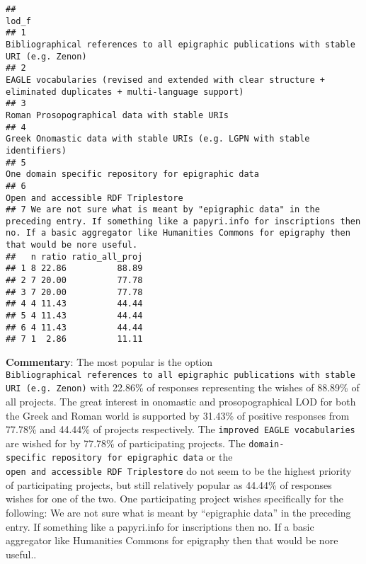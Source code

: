 \documentclass[
]{article}
\begin{document}
\begin{verbatim}
##                                                                                                                                                                                                                              lod_f
## 1                                                                                                                                           Bibliographical references to all epigraphic publications with stable URI (e.g. Zenon)
## 2                                                                                                                  EAGLE vocabularies (revised and extended with clear structure + eliminated duplicates + multi-language support)
## 3                                                                                                                                                                                     Roman Prosopographical data with stable URIs
## 4                                                                                                                                                        Greek Onomastic data with stable URIs (e.g. LGPN with stable identifiers)
## 5                                                                                                                                                                               One domain specific repository for epigraphic data
## 6                                                                                                                                                                                              Open and accessible RDF Triplestore
## 7 We are not sure what is meant by "epigraphic data" in the preceding entry. If something like a papyri.info for inscriptions then no. If a basic aggregator like Humanities Commons for epigraphy then that would be nore useful.
##   n ratio ratio_all_proj
## 1 8 22.86          88.89
## 2 7 20.00          77.78
## 3 7 20.00          77.78
## 4 4 11.43          44.44
## 5 4 11.43          44.44
## 6 4 11.43          44.44
## 7 1  2.86          11.11
\end{verbatim}

\textbf{Commentary}: The most popular is the option
\texttt{Bibliographical\ references\ to\ all\ epigraphic\ publications\ with\ stable\ URI\ (e.g.\ Zenon)}
with 22.86\% of responses representing the wishes of 88.89\% of all
projects. The great interest in onomastic and prosopographical LOD for
both the Greek and Roman world is supported by 31.43\% of positive
responses from 77.78\% and 44.44\% of projects respectively. The
\texttt{improved\ EAGLE\ vocabularies} are wished for by 77.78\% of
participating projects. The
\texttt{domain-specific\ repository\ for\ epigraphic\ data} or the
\texttt{open\ and\ accessible\ RDF\ Triplestore} do not seem to be the
highest priority of participating projects, but still relatively popular
as 44.44\% of responses wishes for one of the two. One participating
project wishes specifically for the following: We are not sure what is
meant by ``epigraphic data'' in the preceding entry. If something like a
papyri.info for inscriptions then no. If a basic aggregator like
Humanities Commons for epigraphy then that would be nore useful..
\end{document}
